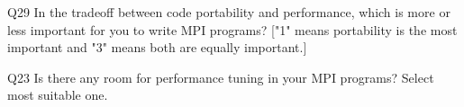 \begin{description}%
\item{Q29} In the tradeoff between code portability and performance, which is more or less important for you to write MPI programs? ["1" means portability is the most important and "3" means both are equally important.]%
\item{Q23} Is there any room for performance tuning in your MPI programs? Select most suitable one.%
\end{description}%
